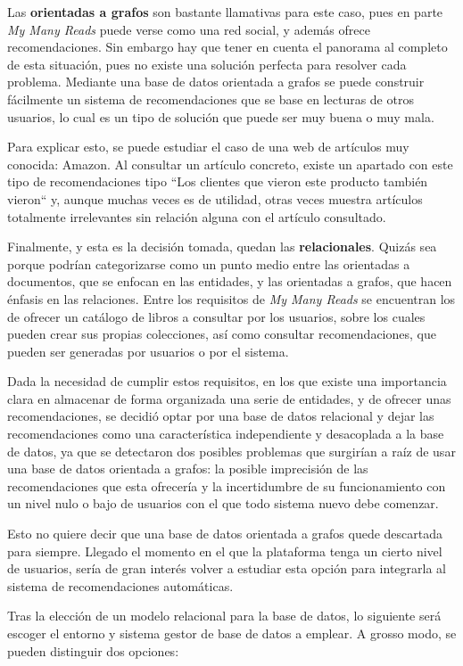 Las \textbf{orientadas a grafos} son bastante llamativas para este caso, pues en parte \textit{My Many Reads} puede verse como una red social, y además ofrece recomendaciones. Sin embargo hay que tener en cuenta el panorama al completo de esta situación, pues no existe una solución perfecta para resolver cada problema. Mediante una base de datos orientada a grafos se puede construir fácilmente un sistema de recomendaciones que se base en lecturas de otros usuarios, lo cual es un tipo de solución que puede ser muy buena o muy mala.

Para explicar esto, se puede estudiar el caso de una web de artículos muy conocida: Amazon. Al consultar un artículo concreto, existe un apartado con este tipo de recomendaciones tipo ``Los clientes que vieron este producto también vieron`` y, aunque muchas veces es de utilidad, otras veces muestra artículos totalmente irrelevantes sin relación alguna con el artículo consultado.

Finalmente, y esta es la decisión tomada, quedan las \textbf{relacionales}. Quizás sea porque podrían categorizarse como un punto medio entre las orientadas a documentos, que se enfocan en las entidades, y las orientadas a grafos, que hacen énfasis en las relaciones. Entre los requisitos de \textit{My Many Reads} se encuentran los de ofrecer un catálogo de libros a consultar por los usuarios, sobre los cuales pueden crear sus propias colecciones, así como consultar recomendaciones, que pueden ser generadas por usuarios o por el sistema.

Dada la necesidad de cumplir estos requisitos, en los que existe una importancia clara en almacenar de forma organizada una serie de entidades, y de ofrecer unas recomendaciones, se decidió optar por una base de datos relacional y dejar las recomendaciones como una característica independiente y desacoplada a la base de datos, ya que se detectaron dos posibles problemas que surgirían a raíz de usar una base de datos orientada a grafos: la posible imprecisión de las recomendaciones que esta ofrecería y la incertidumbre de su funcionamiento con un nivel nulo o bajo de usuarios con el que todo sistema nuevo debe comenzar.

Esto no quiere decir que una base de datos orientada a grafos quede descartada para siempre. Llegado el momento en el que la plataforma tenga un cierto nivel de usuarios, sería de gran interés volver a estudiar esta opción para integrarla al sistema de recomendaciones automáticas.

Tras la elección de un modelo relacional para la base de datos, lo siguiente será escoger el entorno y sistema gestor de base de datos a emplear. A grosso modo, se pueden distinguir dos opciones:

